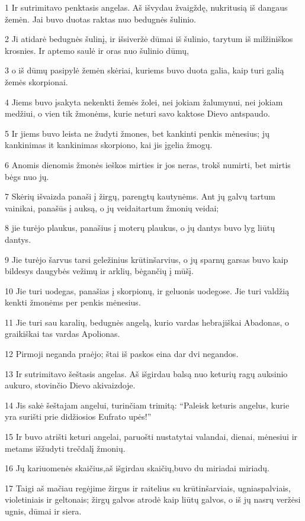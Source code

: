 \par 1 Ir sutrimitavo penktasis angelas. Aš išvydau žvaigždę, nukritusią iš dangaus žemėn. Jai buvo duotas raktas nuo bedugnės šulinio. 
\par 2 Ji atidarė bedugnės šulinį, ir išsiveržė dūmai iš šulinio, tarytum iš milžiniškos krosnies. Ir aptemo saulė ir oras nuo šulinio dūmų, 
\par 3 o iš dūmų pasipylė žemėn skėriai, kuriems buvo duota galia, kaip turi galią žemės skorpionai. 
\par 4 Jiems buvo įsakyta nekenkti žemės žolei, nei jokiam žalumynui, nei jokiam medžiui, o vien tik žmonėms, kurie neturi savo kaktose Dievo antspaudo. 
\par 5 Ir jiems buvo leista ne žudyti žmones, bet kankinti penkis mėnesius; jų kankinimas it kankinimas skorpiono, kai jis įgelia žmogų. 
\par 6 Anomis dienomis žmonės ieškos mirties ir jos neras, trokš numirti, bet mirtis bėgs nuo jų. 
\par 7 Skėrių išvaizda panaši į žirgų, parengtų kautynėms. Ant jų galvų tartum vainikai, panašūs į auksą, o jų veidai­tartum žmonių veidai; 
\par 8 jie turėjo plaukus, panašius į moterų plaukus, o jų dantys buvo lyg liūtų dantys. 
\par 9 Jie turėjo šarvus tarsi geležinius krūtinšarvius, o jų sparnų garsas buvo kaip bildesys daugybės vežimų ir arklių, bėgančių į mūšį. 
\par 10 Jie turi uodegas, panašias į skorpionų, ir geluonis uodegose. Jie turi valdžią kenkti žmonėms per penkis mėnesius. 
\par 11 Jie turi sau karalių, bedugnės angelą, kurio vardas hebrajiškai Abadonas, o graikiškai tas vardas Apolionas. 
\par 12 Pirmoji neganda praėjo; štai iš paskos eina dar dvi negandos. 
\par 13 Ir sutrimitavo šeštasis angelas. Aš išgirdau balsą nuo keturių ragų auksinio aukuro, stovinčio Dievo akivaizdoje. 
\par 14 Jis sakė šeštajam angelui, turinčiam trimitą: “Paleisk keturis angelus, kurie yra surišti prie didžiosios Eufrato upės!” 
\par 15 Ir buvo atrišti keturi angelai, paruošti nustatytai valandai, dienai, mėnesiui ir metams išžudyti trečdalį žmonių. 
\par 16 Jų kariuomenės skaičius,­aš išgirdau skaičių,­buvo du miriadai miriadų. 
\par 17 Taigi aš mačiau regėjime žirgus ir raitelius su krūtinšarviais, ugniaspalviais, violetiniais ir geltonais; žirgų galvos atrodė kaip liūtų galvos, o iš jų nasrų veržėsi ugnis, dūmai ir siera. 

